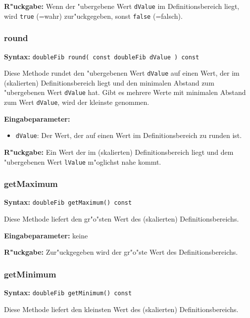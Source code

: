 \bigskip\noindent
\textbf{R"uckgabe:} Wenn der "ubergebene Wert \verb|dValue| im Definitionsbereich liegt, wird \verb|true| (=wahr) zur"uckgegeben, sonst \verb|false| (=falsch).


\subsubsection{round}

\textbf{Syntax:} \verb|doubleFib round( const doubleFib dValue ) const|

\bigskip\noindent
Diese Methode rundet den "ubergebenen Wert \verb|dValue| auf einen Wert, der im (skalierten) Definitionsbereich liegt und den minimalen Abstand zum "ubergebenen Wert \verb|dValue| hat. Gibt es mehrere Werte mit minimalen Abstand zum Wert \verb|dValue|, wird der kleinste genommen.

\bigskip\noindent
\textbf{Eingabeparameter:}
\begin{itemize}
 \item \verb|dValue|: Der Wert, der auf einen Wert im Definitionsbereich zu runden ist.
\end{itemize}

\bigskip\noindent
\textbf{R"uckgabe:} Ein Wert der im (skalierten) Definitionsbereich liegt und dem "ubergebenen Wert \verb|lValue| m"oglichst nahe kommt.


\subsubsection{getMaximum}

\textbf{Syntax:} \verb|doubleFib getMaximum() const|

\bigskip\noindent
Diese Methode liefert den gr"o"sten Wert des (skalierten) Definitionsbereichs.

\bigskip\noindent
\textbf{Eingabeparameter:} keine

\bigskip\noindent
\textbf{R"uckgabe:} Zur"uckgegeben wird der gr"o"ste Wert des Definitionsbereichs.


\subsubsection{getMinimum}

\textbf{Syntax:} \verb|doubleFib getMinimum() const|

\bigskip\noindent
Diese Methode liefert den kleinsten Wert des (skalierten) Definitionsbereichs.

